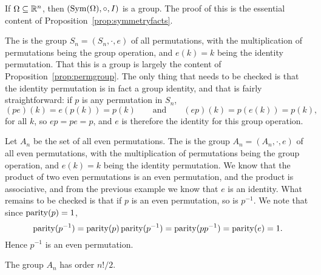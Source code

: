 \begin{example}
  If $\Omega \subseteq \mathbb{R}^{n}$, then $(\operatorname{Sym}(\Omega), \circ, I)$ is a
  group.  The proof of this is the essential content of
  Proposition~\ref{prop:symmetryfacts}.
\end{example}

\begin{example}
  The  is the group $S_{n} = (S_{n},
  \cdot, e)$ of all permutations, with the multiplication of permutations
  being the group operation, and $e(k) = k$ being the identity
  permutation.  That this is a group is largely the content of
  Proposition~\ref{prop:permgroup}.  The only thing that needs to be checked
  is that the identity permutation is in fact a group identity, and that is
  fairly straightforward: if $p$ is any permutation in $S_{n}$,
  \[
    (pe)(k) = e(p(k)) = p(k) \qquad \text{and} \qquad (ep)(k) = p(e(k)) = p(k),
  \]
  for all $k$, so $ep = pe = p$, and $e$ is therefore the identity for this
  group operation.
\end{example}

\begin{example}
  Let $A_{n}$ be the set of all even permutations.
  The  is the group $A_{n} = 
  (A_{n}, \cdot, e)$ of all even permutations, with the multiplication of
  permutations being the group operation, and $e(k) = k$ being the identity
  permutation.  We know that the product of two even permutations is 
  an even permutation, and the product is associative, and from the 
  previous example we know that $e$ is an identity.  What remains to 
  be checked is that if $p$ is an even permutation, so is $p^{-1}$.
  We note that since $\operatorname{parity}(p) = 1$,
  \[
    \operatorname{parity}(p^{-1}) = \operatorname{parity}(p)\operatorname{parity}(p^{-1}) = \operatorname{parity}(pp^{-1}) =
    \operatorname{parity}(e) = 1.
  \]
  Hence $p^{-1}$ is an even permutation.
  
  The group $A_{n}$ has order $n!/2$.
\end{example}

